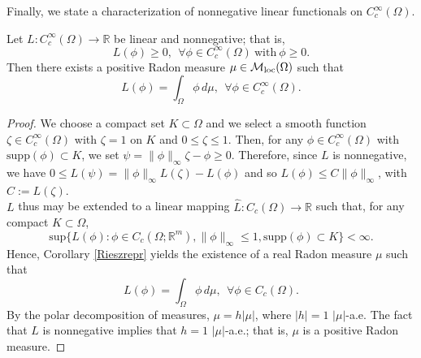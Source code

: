 Finally, we state a characterization of nonnegative linear functionals on $C^{\infty}_{c}(\Omega)$.

\begin{lemma} \label{Schwartzlemma} Let $L : C^{\infty}_{c}(\Omega) \to \mathbb{R}$ be linear and nonnegative; that is, 
\[L(\phi) \ge 0, \ \ \forall \phi \in C^{\infty}_{c}(\Omega) \ \text{with} \ \phi \ge 0.\] 
Then there exists a positive Radon measure $\mu \in \mathcal{M}_{\rm loc}(\Omega)$ such that
\[ L(\phi) = \int_{\Omega} \phi \, d \mu, \ \ \forall \phi \in C^{\infty}_{c}(\Omega). \]
\end{lemma}
\begin{proof} We choose a compact set $K \subset \Omega$ and we select a smooth function $\zeta \in C^{\infty}_{c}(\Omega)$ with $\zeta = 1$ on $K$ and $0 \le \zeta \le 1$. Then, for any $\phi \in C^{\infty}_{c}(\Omega)$ with $\mathrm{supp}(\phi) \subset K$, we set $\psi = \|\phi\|_{\infty} \zeta - \phi \ge 0$. Therefore, since $L$ is nonnegative, we have $0 \le L(\psi) = \|\phi\|_{\infty} L(\zeta) - L(\phi)$ and so $L(\phi) \le C \|\phi\|_{\infty}$, with $C := L(\zeta)$.
\\
$L$ thus may be extended to a linear mapping $\hat{L} : C_{c}(\Omega) \to \mathbb{R}$ such that, for any compact $K \subset \Omega$, 
\[ \mathrm{sup} \{ L(\phi) : \phi \in C_{c} (\Omega; \mathbb{R}^{m}), \|\phi\|_{\infty} \le 1, \mathrm{supp}(\phi) \subset K \} < \infty. \]
Hence, Corollary \ref{Rieszrepr} yields the existence of a real Radon measure $\mu$ such that
\[ L(\phi) = \int_{\Omega} \phi \, d \mu, \ \ \forall \phi \in C_{c}(\Omega). \]
By the polar decomposition of measures, $\mu = h |\mu|$, where $|h| = 1$ $|\mu|$-a.e. The fact that $L$ is nonnegative implies that $h = 1$ $|\mu|$-a.e.; that is, $\mu$ is a positive Radon measure. 
\end{proof}

















